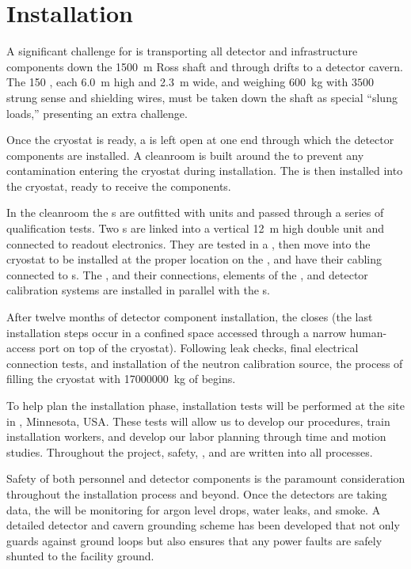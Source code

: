 \section{Installation}

A significant challenge for  is transporting all detector and infrastructure components down the \SI{1500}{\meter} Ross shaft and through drifts to a detector cavern. The 150 , each \SI{6.0}{m} high and \SI{2.3}{m} wide, and  weighing \SI{600}{kg} with $3500$ strung sense and shielding wires, must be taken down the shaft as special ``slung loads,'' presenting an extra challenge. 

Once the  cryostat is ready, %
a  is left open at one end through which the detector components are installed. A cleanroom is built around the  to prevent any contamination entering the cryostat during installation. The  is then installed into the cryostat, ready to receive the  components. 

In the cleanroom the s are outfitted  with  units and passed through a series of qualification tests.
Two s are linked into a vertical \SI{12}{m} high double unit and connected to readout electronics. 
They are tested in a \coldbox, then move into the cryostat to be installed at the proper location on the , and have their cabling connected to \fdth{}s. 
The ,  and their  connections, elements of the , and detector calibration systems are installed in parallel with the s. 

After twelve months of detector component installation, the  closes (the last installation steps occur in a confined space accessed through a narrow human-access port on top of the cryostat). 
Following leak checks, final electrical connection tests, and installation of the neutron calibration source, the process of filling the cryostat with \SI{17000000}{\kilo\gram} of  begins.

To help plan the installation phase, installation tests will be performed at the   site in , Minnesota, USA. These tests will allow us to develop our procedures, train installation workers, and develop our labor planning through time and motion studies. Throughout the project, safety, , and  are written into all processes.

Safety of both personnel and  detector components is the paramount consideration throughout the installation process and beyond. Once the detectors are taking data, %
the  will be monitoring for argon level drops, water leaks, and smoke. A detailed detector and cavern grounding scheme has been developed that not only guards against ground loops but also ensures that any power faults are safely shunted to the facility ground.


